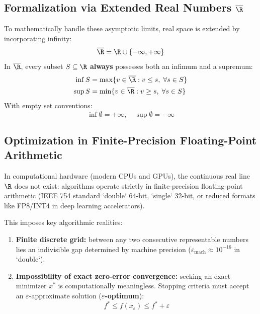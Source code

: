 \subsection[Formalization via Extended Real Numbers]{Formalization via Extended Real Numbers $\overline{\R}$}
To mathematically handle these asymptotic limits, real space is extended by incorporating infinity:
\begin{equation}
\overline{\R} = \R \cup \{-\infty, +\infty\}
\end{equation}
In $\overline{\R}$, every subset $S \subseteq \R$ \textbf{always} possesses both an infimum and a supremum:
\begin{align}
\inf S &= \max \{ v \in \overline{\R} : v \le s, \; \forall s \in S \} \\
\sup S &= \min \{ v \in \overline{\R} : v \ge s, \; \forall s \in S \}
\end{align}
With empty set conventions:
\begin{equation}
\inf \emptyset = +\infty, \quad \sup \emptyset = -\infty
\end{equation}

\subsection[Optimization in Floating-Point Arithmetic]{Optimization in Finite-Precision Floating-Point Arithmetic}
In computational hardware (modern CPUs and GPUs), the continuous real line $\R$ does not exist: algorithms operate strictly in finite-precision floating-point arithmetic (IEEE 754 standard `double` 64-bit, `single` 32-bit, or reduced formats like FP8/INT4 in deep learning accelerators).

This imposes key algorithmic realities:
\begin{enumerate}
    \item \textbf{Finite discrete grid:} between any two consecutive representable numbers lies an indivisible gap determined by machine precision ($\varepsilon_{\text{mach}} \approx 10^{-16}$ in `double`).
    \item \textbf{Impossibility of exact zero-error convergence:} seeking an exact minimizer $x^*$ is computationally meaningless. Stopping criteria must accept an $\varepsilon$-approximate solution (\textbf{$\varepsilon$-optimum}):
    \begin{equation}
    f^* \le f(x_\varepsilon) \le f^* + \varepsilon
    \end{equation}
\end{enumerate}

